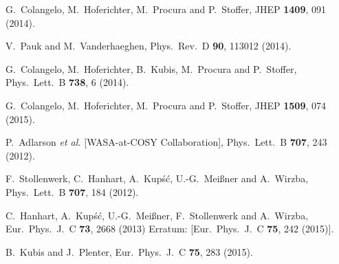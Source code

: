 \documentclass[preprint,12pt,3p]{elsarticle}
\newcommand{\0}{}
\begin{document}
\begin{thebibliography}{99}
  G.~Colangelo, M.~Hoferichter, M.~Procura and P.~Stoffer,
  JHEP {\bf 1409}, 091 (2014).

  V.~Pauk and M.~Vanderhaeghen,
  Phys.\ Rev.\ D {\bf 90},  113012 (2014).

  G.~Colangelo, M.~Hoferichter, B.~Kubis, M.~Procura and P.~Stoffer,
  Phys.\ Lett.\ B {\bf 738}, 6 (2014).

  G.~Colangelo, M.~Hoferichter, M.~Procura and P.~Stoffer,
  JHEP {\bf 1509}, 074 (2015).

  P.~Adlarson {\it et al.} [WASA-at-COSY Collaboration],
  Phys.\ Lett.\ B {\bf 707}, 243 (2012).

  F.~Stollenwerk, C.~Hanhart, A.~Kup\'s\'c, U.-G.~Mei{\ss}ner and A.~Wirzba,
  Phys.\ Lett.\ B {\bf 707}, 184 (2012).

  C.~Hanhart, A.~Kup\'s\'c, U.-G.~Mei{\ss}ner, F.~Stollenwerk and A.~Wirzba,
  Eur.\ Phys.\ J.\ C {\bf 73}, 2668 (2013)
  Erratum: [Eur.\ Phys.\ J.\ C {\bf 75}, 242 (2015)].

  B.~Kubis and J.~Plenter,
  Eur.\ Phys.\ J.\ C {\bf 75}, 283 (2015).


\end{thebibliography}
\end{document}
